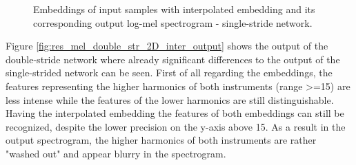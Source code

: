\begin{figure}[htb!]
    \centering
    \captionsetup{justification=centering}
    \caption{Embeddings of input samples with interpolated embedding and its corresponding output log-mel spectrogram - single-stride network.}
    \label{fig:res_mel_single_str_2D_inter_output}
\end{figure}

Figure \ref{fig:res_mel_double_str_2D_inter_output} shows the output of the double-stride network where already significant differences to the output of the single-strided network can be seen. First of all regarding the embeddings, the features representing the higher harmonics of both instruments (range >=15) are less intense while the features of the lower harmonics are still distinguishable. Having the interpolated embedding the features of both embeddings can still be recognized, despite the lower precision on the y-axis above 15. As a result in the output spectrogram, the higher harmonics of both instruments are rather "washed out" and appear blurry in the spectrogram. 

